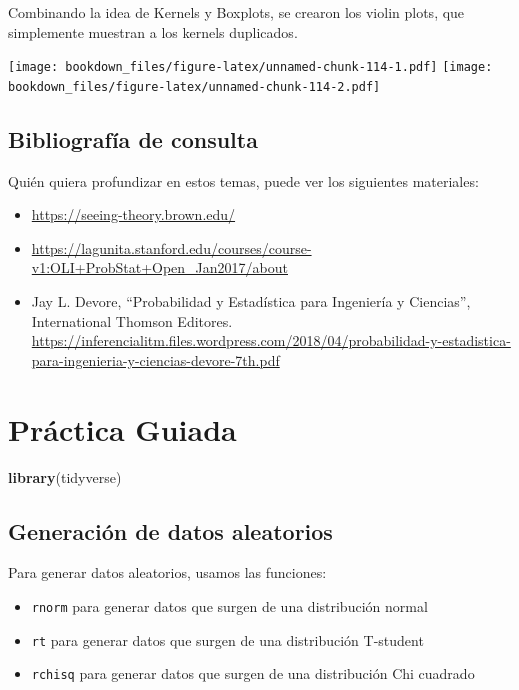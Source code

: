 \documentclass[]{book}
\newenvironment{Shaded}{\begin{snugshade}}{\end{snugshade}}
\newcommand{\KeywordTok}[1]{\textcolor[rgb]{0.13,0.29,0.53}{\textbf{#1}}}
\newcommand{\NormalTok}[1]{#1}
\providecommand{\tightlist}{%
  \setlength{\itemsep}{0pt}\setlength{\parskip}{0pt}}
\begin{document}
Combinando la idea de Kernels y Boxplots, se crearon los violin plots, que simplemente muestran a los kernels duplicados.

\texttt{[image: bookdown\_files/figure-latex/unnamed-chunk-114-1.pdf]} \texttt{[image: bookdown\_files/figure-latex/unnamed-chunk-114-2.pdf]}

\hypertarget{bibliografia-de-consulta-1}{%
\subsection{Bibliografía de consulta}\label{bibliografia-de-consulta-1}}

Quién quiera profundizar en estos temas, puede ver los siguientes materiales:

\begin{itemize}
\tightlist
\item
  \url{https://seeing-theory.brown.edu/}
\item
  \url{https://lagunita.stanford.edu/courses/course-v1:OLI+ProbStat+Open_Jan2017/about}
\item
  Jay L. Devore, ``Probabilidad y Estadística para Ingeniería y Ciencias'', International Thomson Editores. \url{https://inferencialitm.files.wordpress.com/2018/04/probabilidad-y-estadistica-para-ingenieria-y-ciencias-devore-7th.pdf}
\end{itemize}

\hypertarget{practica-guiada-4}{%
\section{Práctica Guiada}\label{practica-guiada-4}}

\begin{Shaded}
\begin{Highlighting}[]
\KeywordTok{library}\NormalTok{(tidyverse)}
\end{Highlighting}
\end{Shaded}

\hypertarget{generacion-de-datos-aleatorios}{%
\subsection{Generación de datos aleatorios}\label{generacion-de-datos-aleatorios}}

Para generar datos aleatorios, usamos las funciones:

\begin{itemize}
\tightlist
\item
  \texttt{rnorm} para generar datos que surgen de una distribución normal
\item
  \texttt{rt} para generar datos que surgen de una distribución T-student
\item
  \texttt{rchisq} para generar datos que surgen de una distribución Chi cuadrado
\end{itemize}
\end{document}

